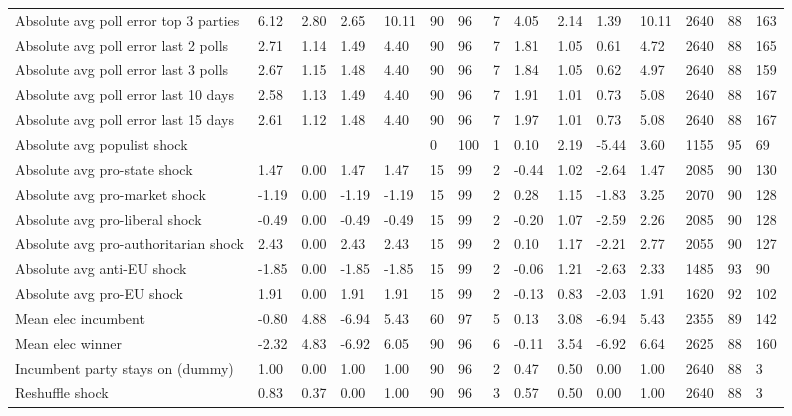 \begin{longtable}{lllllllllllllll}
Absolute avg poll error top 3 parties & 6.12 & 2.80 & 2.65 & 10.11 & 90 & 96 & 7 & 4.05 & 2.14 & 1.39 & 10.11 & 2640 & 88 & 163\\
\addlinespace
Absolute avg poll error last 2 polls & 2.71 & 1.14 & 1.49 & 4.40 & 90 & 96 & 7 & 1.81 & 1.05 & 0.61 & 4.72 & 2640 & 88 & 165\\
Absolute avg poll error last 3 polls & 2.67 & 1.15 & 1.48 & 4.40 & 90 & 96 & 7 & 1.84 & 1.05 & 0.62 & 4.97 & 2640 & 88 & 159\\
Absolute avg poll error last 10 days & 2.58 & 1.13 & 1.49 & 4.40 & 90 & 96 & 7 & 1.91 & 1.01 & 0.73 & 5.08 & 2640 & 88 & 167\\
Absolute avg poll error last 15 days & 2.61 & 1.12 & 1.48 & 4.40 & 90 & 96 & 7 & 1.97 & 1.01 & 0.73 & 5.08 & 2640 & 88 & 167\\
Absolute avg populist shock &  &  &  &  & 0 & 100 & 1 & 0.10 & 2.19 & -5.44 & 3.60 & 1155 & 95 & 69\\
\addlinespace
Absolute avg pro-state shock & 1.47 & 0.00 & 1.47 & 1.47 & 15 & 99 & 2 & -0.44 & 1.02 & -2.64 & 1.47 & 2085 & 90 & 130\\
Absolute avg pro-market shock & -1.19 & 0.00 & -1.19 & -1.19 & 15 & 99 & 2 & 0.28 & 1.15 & -1.83 & 3.25 & 2070 & 90 & 128\\
Absolute avg pro-liberal shock & -0.49 & 0.00 & -0.49 & -0.49 & 15 & 99 & 2 & -0.20 & 1.07 & -2.59 & 2.26 & 2085 & 90 & 128\\
Absolute avg pro-authoritarian shock & 2.43 & 0.00 & 2.43 & 2.43 & 15 & 99 & 2 & 0.10 & 1.17 & -2.21 & 2.77 & 2055 & 90 & 127\\
Absolute avg anti-EU shock & -1.85 & 0.00 & -1.85 & -1.85 & 15 & 99 & 2 & -0.06 & 1.21 & -2.63 & 2.33 & 1485 & 93 & 90\\
\addlinespace
Absolute avg pro-EU shock & 1.91 & 0.00 & 1.91 & 1.91 & 15 & 99 & 2 & -0.13 & 0.83 & -2.03 & 1.91 & 1620 & 92 & 102\\
Mean elec incumbent & -0.80 & 4.88 & -6.94 & 5.43 & 60 & 97 & 5 & 0.13 & 3.08 & -6.94 & 5.43 & 2355 & 89 & 142\\
Mean elec winner & -2.32 & 4.83 & -6.92 & 6.05 & 90 & 96 & 6 & -0.11 & 3.54 & -6.92 & 6.64 & 2625 & 88 & 160\\
Incumbent party stays on (dummy) & 1.00 & 0.00 & 1.00 & 1.00 & 90 & 96 & 2 & 0.47 & 0.50 & 0.00 & 1.00 & 2640 & 88 & 3\\
Reshuffle shock & 0.83 & 0.37 & 0.00 & 1.00 & 90 & 96 & 3 & 0.57 & 0.50 & 0.00 & 1.00 & 2640 & 88 & 3\\

\end{longtable}
